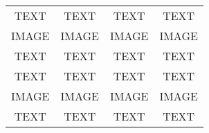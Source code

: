 \documentclass[10pt]{article}
\begin{document}
\pagestyle{empty}
\begin{center}
	\begin{tabular}{|c|c||c|c|}
	\hline
	TEXT & TEXT & TEXT & TEXT \\
	IMAGE & IMAGE  &  IMAGE & IMAGE \\
	TEXT & TEXT & TEXT & TEXT \\
	\hline
	TEXT & TEXT & TEXT & TEXT \\
	IMAGE & IMAGE  &  IMAGE & IMAGE \\
	TEXT & TEXT & TEXT & TEXT \\
	\hline

	\end{tabular}
\end{center}
\end{document}
